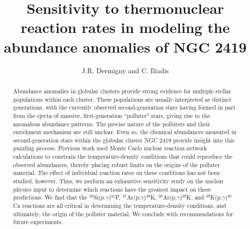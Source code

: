 \documentclass[twocolumn]{aastex6}
\newcommand{\nuclei}[2]{$^{#1}${#2}}
\begin{document}
\title{Sensitivity to thermonuclear reaction rates in modeling the abundance anomalies of NGC 2419}
\author{J.R. Dermigny  and C. Iliadis }
\begin{abstract}
Abundance anomalies in globular clusters provide strong evidence for multiple stellar populations within each cluster. 
These populations are usually interpreted as distinct generations, with the currently observed second-generation stars having formed in part
from the ejecta of massive, first-generation ``polluter" stars, giving rise to the anomalous abundance patterns. The precise nature of the polluters and their enrichment mechanism are still unclear.
Even so, the chemical abundances measured in second-generation stars within the globular cluster NGC 2419 provide insight into this puzzling process.
Previous work used Monte Carlo nuclear reaction network calculations to constrain the temperature-density conditions that could reproduce the observed abundances, thereby placing robust limits on the origins of the polluter material. The effect of individual reaction rates on these conditions has not been studied, however.
Thus, we perform an exhaustive sensitivity study on the nuclear physics input to determine which reactions have the greatest impact on these predictions. 
We find that the \nuclei{30}{Si}(p,$\gamma$)\nuclei{31}{P}, \nuclei{37}{Ar}(p,$\gamma$)\nuclei{38}{K}, \nuclei{38}{Ar}(p,$\gamma$)\nuclei{39}{K},
and \nuclei{39}{K}(p,$\gamma$)\nuclei{40}{Ca} reactions are all critical in determining the temperature-density conditions, and ultimately, the origin of the polluter material. We conclude with recommendations for future experiments.
\end{abstract}

\end{document}
